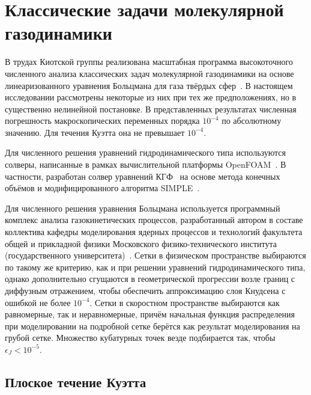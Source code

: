 \chapter{Классические задачи молекулярной газодинамики} \label{chapt:problems}

В трудах Киотской группы реализована масштабная программа высокоточного численного анализа
классических задач молекулярной газодинамики на основе линеаризованного уравнения Больцмана
для газа твёрдых сфер~\cite{Sone2002, Sone2007}.
В настоящем исследовании рассмотрены некоторые из них при тех же предположениях,
но в существенно нелинейной постановке.
В представленных результатах численная погрешность макроскопических переменных
порядка \(10^{-4}\) по абсолютному значению.
Для течения Куэтта она не превышает \(10^{-4}\).

Для численного решения уравнений гидродинамического типа используются солверы,
написанные в рамках вычислительной платформы OpenFOAM~\cite{openfoam}.
В частности, разработан солвер уравнений КГФ~\cite{Rogozin2014} на основе метода конечных объёмов
и модифицированного алгоритма SIMPLE~\cite{SIMPLE}.

Для численного решения уравнения Больцмана используется программный комплекс
анализа газокинетических процессов, разработанный автором в составе коллектива
кафедры моделирования ядерных процессов и технологий факультета общей и прикладной физики
Московского физико-технического института (государственного университета)~\cite{Rogozin2010, Rogozin2011, Kloss2012}.
Сетки в физическом пространстве выбираются по такому же критерию,
как и при решении уравнений гидродинамического типа,
однако дополнительно сгущаются в геометрической прогрессии возле границ с диффузным отражением,
чтобы обеспечить аппроксимацию слоя Кнудсена с ошибкой не более \(10^{-4}\).
Сетки в скоростном пространстве выбираются как равномерные, так и неравномерные,
причём начальная функция распределения при моделировании на подробной сетке берётся
как результат моделирования на грубой сетке.
Множество кубатурных точек везде подбирается так, чтобы \(\epsilon_J < 10^{-5}\).

\section{Плоское течение Куэтта} \label{sect:couette}

